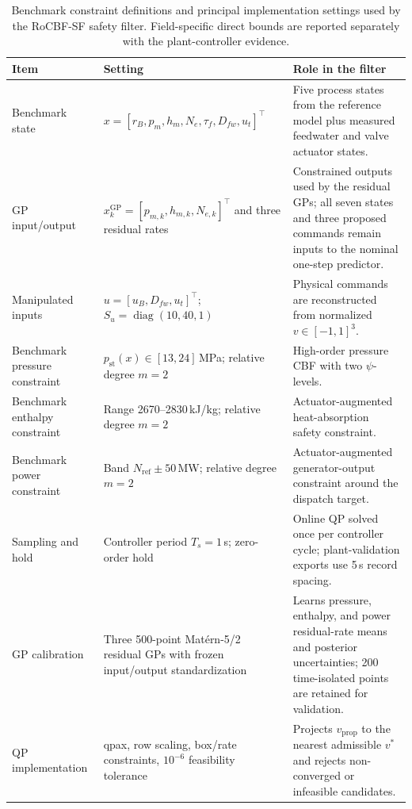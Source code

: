 \begin{table}[htbp]
    \centering
    \caption{Benchmark constraint definitions and principal implementation settings used by the RoCBF-SF safety filter. Field-specific direct bounds are reported separately with the plant-controller evidence.}
    \label{tab:implementation_settings}
    \small
    \renewcommand{\arraystretch}{0.98}
    \begin{tabular}{>{\raggedright\arraybackslash}p{}>{\raggedright\arraybackslash}p{}>{\raggedright\arraybackslash}p{}}
        \toprule
        Item & Setting & Role in the filter \\
        \midrule
        Benchmark state & $x=[r_B,p_m,h_m,N_e,\tau_f,D_{fw},u_t]^\top$ & Five process states from the reference model plus measured feedwater and valve actuator states. \\
        GP input/output & $x_k^{\mathrm{GP}}=[p_{m,k},h_{m,k},N_{e,k}]^\top$ and three residual rates & Constrained outputs used by the residual GPs; all seven states and three proposed commands remain inputs to the nominal one-step predictor. \\
        Manipulated inputs & $u=[u_B,D_{fw},u_t]^\top$; $S_u=\operatorname{diag}(10,40,1)$ & Physical commands are reconstructed from normalized $v\in[-1,1]^3$. \\
        Benchmark pressure constraint & $p_{\mathrm{st}}(x)\in[13,24]$\,MPa; relative degree $m=2$ & High-order pressure CBF with two $\psi$-levels. \\
        Benchmark enthalpy constraint & Range 2670--2830\,kJ/kg; relative degree $m=2$ & Actuator-augmented heat-absorption safety constraint. \\
        Benchmark power constraint & Band $N_{\mathrm{ref}}\pm50$\,MW; relative degree $m=2$ & Actuator-augmented generator-output constraint around the dispatch target. \\
        Sampling and hold & Controller period $T_s=1$\,s; zero-order hold & Online QP solved once per controller cycle; plant-validation exports use 5\,s record spacing. \\
        GP calibration & Three 500-point Mat\'{e}rn-5/2 residual GPs with frozen input/output standardization & Learns pressure, enthalpy, and power residual-rate means and posterior uncertainties; 200 time-isolated points are retained for validation. \\
        QP implementation & qpax, row scaling, box/rate constraints, $10^{-6}$ feasibility tolerance & Projects $v_{\mathrm{prop}}$ to the nearest admissible $v^*$ and rejects non-converged or infeasible candidates. \\

\end{tabular}
\end{table}
